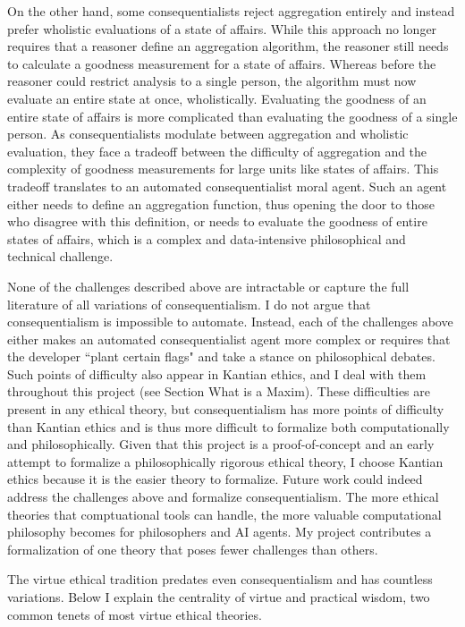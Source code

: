 \begin{isabellebody}
\begin{isamarkuptext}
On the other hand, some consequentialists reject aggregation entirely and instead prefer wholistic
evaluations of a state of affairs. While this approach no longer requires that a reasoner define an 
aggregation algorithm, the reasoner still needs to calculate a goodness measurement for a state of 
affairs. Whereas before the reasoner could restrict analysis to a single person, the algorithm must now 
evaluate an entire state at once, wholistically. Evaluating the goodness of an entire state of affairs is more complicated
than evaluating the goodness of a single person. As consequentialists modulate between aggregation 
and wholistic evaluation, they face a tradeoff between the difficulty of aggregation and the complexity 
of goodness measurements for large units like states of affairs. This tradeoff translates to an automated
consequentialist moral agent. Such an agent either needs to define an aggregation function, thus opening 
the door to those who disagree with this definition, or needs to evaluate the goodness of entire states
of affairs, which is a complex and data-intensive philosophical and technical challenge.

None of the challenges described above are intractable or capture the full literature of 
all variations of consequentialism. I do not argue that consequentialism is 
impossible to automate. Instead, each of the challenges above either makes an automated consequentialist
agent more complex or requires that the developer ``plant certain flags" and take a stance on philosophical
debates. Such points of difficulty also appear in Kantian ethics, and I deal with them throughout this
project (see Section What is a Maxim). These difficulties are present in any ethical theory, but consequentialism
has more points of difficulty than Kantian ethics and is thus more difficult to formalize both computationally
and philosophically. Given that this project is a proof-of-concept and an early attempt to formalize
a philosophically rigorous ethical theory, I choose Kantian ethics because it is the easier theory to 
formalize. Future work could indeed address the challenges above and formalize consequentialism. The more
ethical theories that comptuational tools can handle, the more valuable computational philosophy becomes 
for philosophers and AI agents. My project contributes a formalization of one theory that poses fewer
challenges than others.%
\end{isamarkuptext}\isamarkuptrue%
%
\isadelimdocument
%
\endisadelimdocument
%
\isatagdocument
%
\isamarkuptrue%
%
\endisatagdocument
{\isafolddocument}%
%
\isadelimdocument
%
\endisadelimdocument
%
\begin{isamarkuptext}%
The virtue ethical tradition predates even consequentialism and has countless variations. Below
I explain the centrality of virtue and practical wisdom, two common tenets of most virtue ethical theories.


\end{isamarkuptext}
\end{isabellebody}
